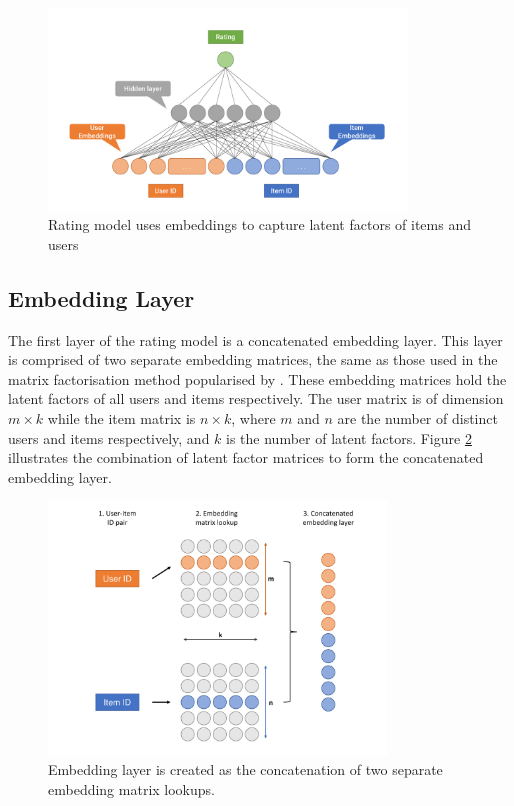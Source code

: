 \begin{figure}[H]
\centering
\includegraphics[width=0.85\textwidth]{Figures/4_rating-model.pdf}
\decoRule
\caption[Rating model]{Rating model uses embeddings to capture latent factors of items and users}
\label{fig:4_rating-prediction-architecture}
\end{figure}

\subsection{Embedding Layer}
The first layer of the rating model is a concatenated embedding layer. This layer is comprised of two separate embedding matrices, the same as those used in the matrix factorisation method popularised by \citeauthor{koren2009matrix}. These embedding matrices hold the latent factors of all users and items respectively. The user matrix is of dimension $m\times k$ while the item matrix is $n\times k$, where $m$ and $n$ are the number of distinct users and items respectively, and $k$ is the number of latent factors. Figure \ref{fig:4_CGT-embedding-layer} illustrates the combination of latent factor matrices to form the concatenated embedding layer.

\begin{figure}[H]
\centering
\includegraphics[width=0.8\textwidth]{Figures/4_CGT-embedding-layer.pdf}
\decoRule
\caption[Embedding layer]{Embedding layer is created as the concatenation of two separate embedding matrix lookups.}
\label{fig:4_CGT-embedding-layer}
\end{figure}

